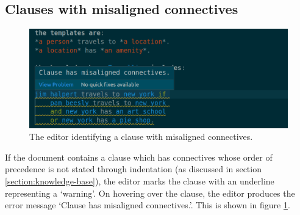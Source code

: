\documentclass[../main.tex]{subfiles}
\begin{document}
\subsection{Clauses with misaligned connectives}
\begin{figure}[h!]
\centering
\includegraphics[width = \linewidth]{./figures/misaligned-connectives.png}
\caption{The editor identifying a clause with misaligned connectives.}
\label{fig:misaligned-connectives}
\end{figure}
If the document contains a clause which has connectives whose order of precedence is not stated through indentation (as discussed in section \ref{section:knowledge-base}), the editor marks the clause with an underline representing a `warning'. On hovering over the clause, the editor produces the error message `Clause has misaligned connectives.'. This is shown in figure \ref{fig:misaligned-connectives}.
\end{document}
